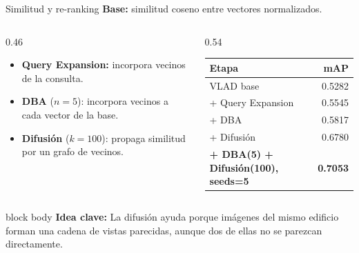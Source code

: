 \documentclass[aspectratio=169]{beamer}
\newcommand{\ideaclave}[1]{%
  \vfill
  \begin{beamercolorbox}[wd=\textwidth,sep=0.35em]{block body}
    \small\textbf{Idea clave:} #1
  \end{beamercolorbox}
}
\begin{document}
\begin{frame}{Similitud y re-ranking}
  \textbf{Base:} similitud coseno entre vectores normalizados.
  \begin{columns}[T]
    \begin{column}{0.46\textwidth}
      \begin{itemize}
        \item \textbf{Query Expansion:} incorpora vecinos de la consulta.
        \item \textbf{DBA} ($n{=}5$): incorpora vecinos a cada vector de la base.
        \item \textbf{Difusi\'on} ($k{=}100$): propaga similitud por un grafo de vecinos.
      \end{itemize}
    \end{column}
    \begin{column}{0.54\textwidth}
      \scriptsize
      \begin{tabular}{lr}
        \toprule
        \textbf{Etapa} & \textbf{mAP} \\
        \midrule
        VLAD base                          & 0.5282 \\
        + Query Expansion                  & 0.5545 \\
        + DBA                              & 0.5817 \\
        + Difusi\'on                       & 0.6780 \\
        \rowcolor{ProjLight}
        \textbf{+ DBA(5) + Difusi\'on(100), seeds=5} & \textbf{0.7053} \\
        \bottomrule
      \end{tabular}
    \end{column}
  \end{columns}
  \ideaclave{La difusi\'on ayuda porque im\'agenes del mismo edificio forman una cadena de vistas parecidas, aunque dos de ellas no se parezcan directamente.}
\end{frame}
\end{document}
